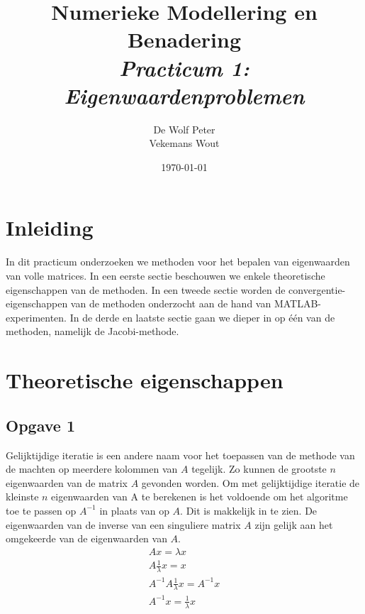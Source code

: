 \documentclass[a4paper, 12pt, titlepage]{report}
\begin{document}
\title{\textbf{Numerieke Modellering en Benadering}\\\textit{Practicum 1: Eigenwaardenproblemen}\\}
\author{De Wolf Peter\\ Vekemans Wout}

\date{\today}
\begin{titlepage}
	\maketitle
	\thispagestyle{empty}
\end{titlepage}

\newpage
\tableofcontents

\listoffigures

\newpage

\section{Inleiding}
In dit practicum onderzoeken we methoden voor het bepalen van eigenwaarden van volle matrices. In een eerste sectie beschouwen we enkele theoretische eigenschappen van de methoden. In een tweede sectie worden de convergentie-eigenschappen van de methoden onderzocht aan de hand van MATLAB-experimenten. In de derde en laatste sectie gaan we dieper in op \'e\'en van de methoden, namelijk de Jacobi-methode.
\section{Theoretische eigenschappen}


\subsection{Opgave 1}
Gelijktijdige iteratie is een andere naam voor het toepassen van de methode van de machten op meerdere kolommen van $A$ tegelijk. Zo kunnen de grootste $n$ eigenwaarden van de matrix $A$ gevonden worden.  Om met gelijktijdige iteratie de kleinste $n$ eigenwaarden van A te berekenen is het voldoende om het algoritme toe te passen op $A^{-1}$ in plaats van op $A$. Dit is makkelijk in te zien. De eigenwaarden van de inverse van een singuliere matrix $A$ zijn gelijk aan het omgekeerde van de eigenwaarden van $A$.\\
\begin{subequations} \label{eq:simIt}
\begin{align}
 Ax  = \lambda x \\
A\frac{1}{\lambda}x =  x\\
A^{-1}A\frac{1}{\lambda}x  =  A^{-1}x\\
A^{-1}x  =  \frac{1}{\lambda}x
\end{align}
\end{subequations}
\end{document}
